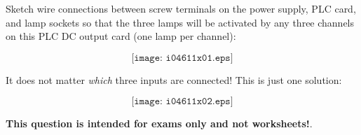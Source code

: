 

Sketch wire connections between screw terminals on the power supply, PLC card, and lamp sockets so that the three lamps will be activated by any three channels on this PLC DC output card (one lamp per channel):

$$\texttt{[image: i04611x01.eps]}$$







It does not matter {\it which} three inputs are connected!  This is just one solution:

$$\texttt{[image: i04611x02.eps]}$$







{\bf This question is intended for exams only and not worksheets!}.



